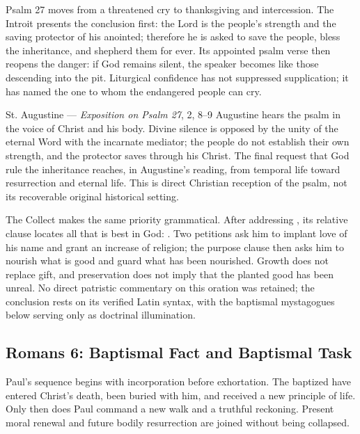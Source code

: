 \begin{deepstudy}
Psalm 27 moves from a threatened cry to thanksgiving and intercession. The Introit presents the conclusion first: the Lord is the people's strength and the saving protector of his anointed; therefore he is asked to save the people, bless the inheritance, and shepherd them for ever. Its appointed psalm verse then reopens the danger: if God remains silent, the speaker becomes like those descending into the pit. Liturgical confidence has not suppressed supplication; it has named the one to whom the endangered people can cry.

\begin{sourcecard}{St. Augustine --- \emph{Exposition on Psalm 27}, 2, 8--9}
Augustine hears the psalm in the voice of Christ and his body. Divine silence is opposed by the unity of the eternal Word with the incarnate mediator; the people do not establish their own strength, and the protector saves through his Christ. The final request that God rule the inheritance reaches, in Augustine's reading, from temporal life toward resurrection and eternal life. This is direct Christian reception of the psalm, not its recoverable original historical setting.
\end{sourcecard}

The Collect makes the same priority grammatical. After addressing , its relative clause locates all that is best in God: . Two petitions ask him to implant love of his name and grant an increase of religion; the purpose clause then asks him to nourish what is good and guard what has been nourished. Growth does not replace gift, and preservation does not imply that the planted good has been unreal. No direct patristic commentary on this oration was retained; the conclusion rests on its verified Latin syntax, with the baptismal mystagogues below serving only as doctrinal illumination.

\sectionguard
\subsection*{Romans 6: Baptismal Fact and Baptismal Task\enspace{}}

Paul's sequence begins with incorporation before exhortation. The baptized have entered Christ's death, been buried with him, and received a new principle of life. Only then does Paul command a new walk and a truthful reckoning. Present moral renewal and future bodily resurrection are joined without being collapsed.


\end{deepstudy}
